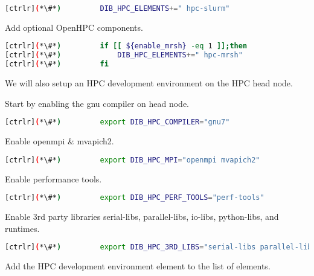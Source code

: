 \begin{lstlisting}[language=bash,keywords={}]
[ctrlr](*\#*)         DIB_HPC_ELEMENTS+=" hpc-slurm"
\end{lstlisting} 

	Add optional OpenHPC components.


\begin{lstlisting}[language=bash,keywords={}]
[ctrlr](*\#*)         if [[ ${enable_mrsh} -eq 1 ]];then
[ctrlr](*\#*)             DIB_HPC_ELEMENTS+=" hpc-mrsh"
[ctrlr](*\#*)         fi
\end{lstlisting} 

	We will also setup an HPC development environment on the HPC head node. 

	Start by enabling the gnu compiler on head node.


\begin{lstlisting}[language=bash,keywords={}]
[ctrlr](*\#*)         export DIB_HPC_COMPILER="gnu7"
\end{lstlisting} 

	Enable openmpi \& mvapich2.


\begin{lstlisting}[language=bash,keywords={}]
[ctrlr](*\#*)         export DIB_HPC_MPI="openmpi mvapich2"
\end{lstlisting} 

	Enable performance tools.


\begin{lstlisting}[language=bash,keywords={}]
[ctrlr](*\#*)         export DIB_HPC_PERF_TOOLS="perf-tools"
\end{lstlisting} 

	Enable 3rd party libraries serial-libs, parallel-libs, io-libs, python-libs, and runtimes.


\begin{lstlisting}[language=bash,keywords={}]
[ctrlr](*\#*)         export DIB_HPC_3RD_LIBS="serial-libs parallel-libs io-libs python-libs runtimes"
\end{lstlisting} 

	Add the HPC development environment element to the list of elements.

